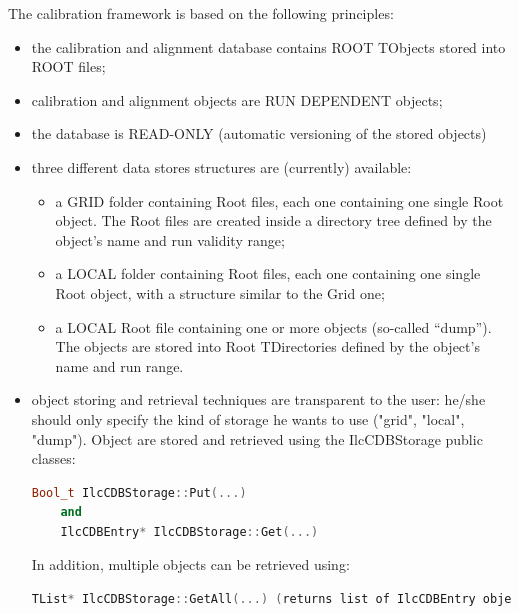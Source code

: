 \documentclass[12pt,a4paper,twoside]{article}
\begin{document}
{The calibration framework is based on the following principles:

\begin{itemize}

\item the calibration and alignment database contains ROOT TObjects stored 
  into ROOT files;

\item calibration and alignment objects are RUN DEPENDENT objects;

\item the database is READ-ONLY (automatic versioning of the stored 
  objects)

\item three different data stores structures are (currently) available:
  \begin{itemize}
  \item a GRID folder containing Root files, each one containing one 
    single Root object. The Root files are created inside a directory tree 
    defined by the object's name and run validity range;
    
  \item a LOCAL folder containing Root files, each one containing one
    single Root object, with a structure similar to the Grid one;

  \item a LOCAL Root file containing one or more objects (so-called ``dump''). The 
    objects are stored into Root TDirectories defined by the
    object's name and run range.
  \end{itemize}

\item object storing and retrieval techniques are transparent to the user: 
  he/she should only specify the kind of storage he wants to use ("grid", 
  "local", "dump"). Object are stored and retrieved using the IlcCDBStorage 
  public classes:

  \begin{lstlisting}[language=C++]
    Bool_t IlcCDBStorage::Put(...) 
    and 
    IlcCDBEntry* IlcCDBStorage::Get(...) 
  \end{lstlisting}

  In addition, multiple objects can be retrieved using:

  \begin{lstlisting}[language=C++]
    TList* IlcCDBStorage::GetAll(...) (returns list of IlcCDBEntry objects).
  \end{lstlisting}


\end{itemize}}
\end{document}
